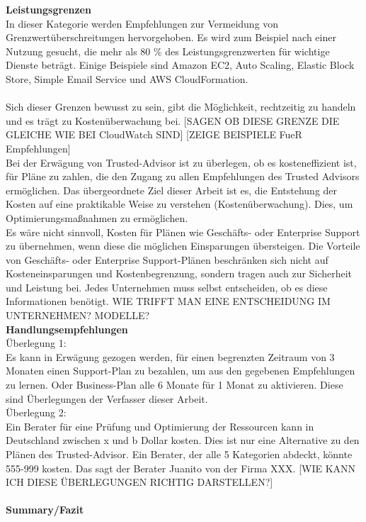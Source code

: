 \textbf{Leistungsgrenzen}\\
In dieser Kategorie werden Empfehlungen zur Vermeidung von Grenzwertüberschreitungen hervorgehoben.
Es wird zum Beispiel nach einer Nutzung gesucht, die mehr als 80 \% des Leistungsgrenzwerten für wichtige Dienste beträgt. Einige Beispiele sind  Amazon EC2, Auto Scaling, Elastic Block Store, Simple Email Service und AWS CloudFormation.
\\\\
Sich dieser Grenzen bewusst zu sein, gibt die Möglichkeit, rechtzeitig zu handeln und es trägt zu Kostenüberwachung bei.
[SAGEN OB DIESE GRENZE DIE GLEICHE WIE BEI CloudWatch SIND]
[ZEIGE BEISPIELE FueR Empfehlungen]\\
Bei der Erwägung von Trusted-Advisor ist zu überlegen, ob es kosteneffizient ist, für Pläne zu zahlen, die den Zugang zu allen Empfehlungen des Trusted Advisors ermöglichen. Das übergeordnete Ziel dieser Arbeit ist es, die Entstehung der Kosten auf eine praktikable Weise zu verstehen (Kostenüberwachung). Dies, um Optimierungsmaßnahmen zu ermöglichen. 
\\
Es wäre nicht sinnvoll, Kosten für Plänen wie Geschäfts- oder Enterprise Support zu übernehmen, wenn diese die möglichen Einsparungen übersteigen.  Die Vorteile von Geschäfts- oder Enterprise Support-Plänen beschränken sich nicht auf Kosteneinsparungen und Kostenbegrenzung, sondern tragen auch zur Sicherheit und Leistung bei. Jedes Unternehmen muss selbst entscheiden, ob es diese Informationen benötigt.
WIE TRIFFT MAN EINE ENTSCHEIDUNG IM UNTERNEHMEN? MODELLE?
\\
\textbf{Handlungsempfehlungen} \\
Überlegung 1: \\
Es kann in Erwägung gezogen werden, für einen begrenzten Zeitraum von 3 Monaten einen Support-Plan zu bezahlen, um aus den gegebenen Empfehlungen zu lernen. Oder Business-Plan alle 6 Monate für 1 Monat zu aktivieren. Diese sind Überlegungen der Verfasser dieser Arbeit. 
\\
Überlegung 2: \\ 
Ein Berater für eine Prüfung und Optimierung der Ressourcen kann in Deutschland zwischen x und b Dollar kosten. Dies ist nur eine Alternative zu den Plänen des Trusted-Advisor. Ein Berater, der alle 5 Kategorien abdeckt, könnte 555-999 kosten. Das sagt der Berater Juanito von der Firma XXX.
[WIE KANN ICH DIESE ÜBERLEGUNGEN RICHTIG DARSTELLEN?]
\\\\
\textbf{Summary/Fazit}\\
